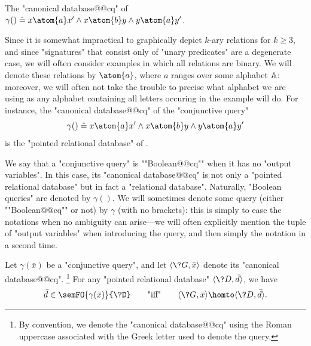 \begin{marginfigure}
	\centering
	\caption{\AP\label{fig:prelim-db-ex-db}
	The "canonical database@@cq" of $\gamma() \defeq x \atom{a} x' \land x \atom{b} y \land y \atom{a} y'$.}
\end{marginfigure}
Since it is somewhat impractical to graphically depict $k$-ary relations for $k \geq 3$,
and since "signatures" that consist only of "unary predicates" are a degenerate case,
we will often consider examples in which all relations are binary.
We will denote these relations by $\atom{a}$, where $a$ ranges over some alphabet $\mathbb{A}$:
moreover, we will often not take the trouble to precise what alphabet we are using
as any alphabet containing all letters occuring in the example will do.
For instance, the "canonical database@@cq" of the "conjunctive query"
\[
	\gamma() \defeq x \atom{a} x' \land x \atom{b} y \land y \atom{a} y'
\]
is the "pointed relational database" of .

We say that a "conjunctive query" is ""Boolean@@cq"" when it has no "output variables".
In this case, its "canonical database@@cq" is not only a "pointed relational database" but
in fact a "relational database".
Naturally, "Boolean queries" are denoted by $\gamma()$.
We will sometimes denote some query (either ""Boolean@@cq"" or not)
by $\gamma$ (with no brackets): this is simply to ease the notations when
no ambiguity can arise---we will often explicitly mention the tuple of "output variables"
when introducing the query, and then simply the notation in a second time.

\begin{proposition}[""Duality""]
	\AP\label{prop:duality}
	Let $\gamma(\bar x)$ be a "conjunctive query",
	and let $\tup{\?G, \bar x}$ denote its "canonical database@@cq".%
	\footnote{By convention, we denote the "canonical database@@cq" using the Roman
	uppercase associated with the Greek letter used to denote
	the query.}
	For any "pointed relational database" $\tup{\?D, \bar d}$,
	we have
	\[
		\bar d \in \semFO{\gamma(\bar x)}{\?D}
		\qquad\text{"iff"}\qquad
		\tup{\?G, \bar x} \homto \tup{\?D, \bar d}.
	\]
\end{proposition}

